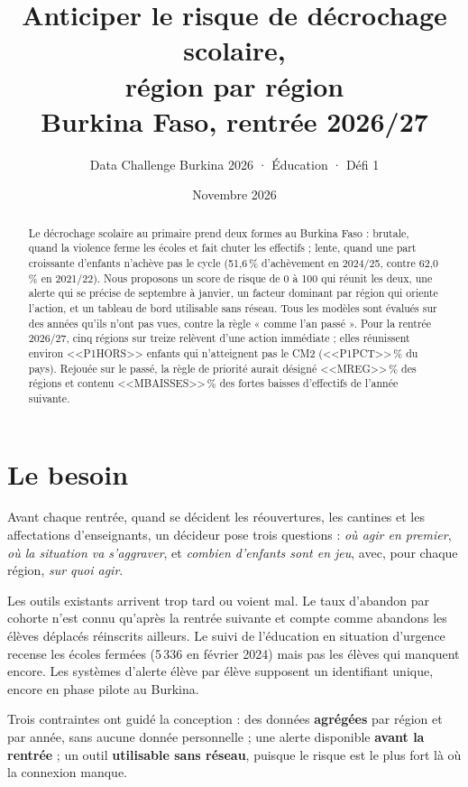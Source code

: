 \documentclass[11pt,a4paper]{article}
\title{\textbf{Anticiper le risque de décrochage scolaire,\\ région par région}\\[4pt]\large Burkina Faso, rentrée 2026/27}
\author{Data Challenge Burkina 2026 · Éducation · Défi 1}
\date{Novembre 2026}
\begin{document}
\maketitle

\begin{abstract}
\noindent Le décrochage scolaire au primaire prend deux formes au Burkina Faso : brutale, quand la violence ferme les écoles et fait chuter les effectifs ; lente, quand une part croissante d'enfants n'achève pas le cycle (51,6\,\% d'achèvement en 2024/25, contre 62,0\,\% en 2021/22). Nous proposons un score de risque de 0 à 100 qui réunit les deux, une alerte qui se précise de septembre à janvier, un facteur dominant par région qui oriente l'action, et un tableau de bord utilisable sans réseau. Tous les modèles sont évalués sur des années qu'ils n'ont pas vues, contre la règle « comme l'an passé ». Pour la rentrée 2026/27, cinq régions sur treize relèvent d'une action immédiate ; elles réunissent environ <<P1HORS>> enfants qui n'atteignent pas le CM2 (<<P1PCT>>\,\% du pays). Rejouée sur le passé, la règle de priorité aurait désigné <<MREG>>\,\% des régions et contenu <<MBAISSES>>\,\% des fortes baisses d'effectifs de l'année suivante.
\end{abstract}

\section{Le besoin}
Avant chaque rentrée, quand se décident les réouvertures, les cantines et les affectations d'enseignants, un décideur pose trois questions : \emph{où agir en premier}, \emph{où la situation va s'aggraver}, et \emph{combien d'enfants sont en jeu}, avec, pour chaque région, \emph{sur quoi agir}.

Les outils existants arrivent trop tard ou voient mal. Le taux d'abandon par cohorte n'est connu qu'après la rentrée suivante et compte comme abandons les élèves déplacés réinscrits ailleurs. Le suivi de l'éducation en situation d'urgence recense les écoles fermées (5\,336 en février 2024) mais pas les élèves qui manquent encore. Les systèmes d'alerte élève par élève supposent un identifiant unique, encore en phase pilote au Burkina.

Trois contraintes ont guidé la conception : des données \textbf{agrégées} par région et par année, sans aucune donnée personnelle ; une alerte disponible \textbf{avant la rentrée} ; un outil \textbf{utilisable sans réseau}, puisque le risque est le plus fort là où la connexion manque.
\end{document}
